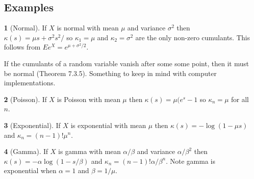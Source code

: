 \documentclass[11pt]{article}
\theoremstyle{definition}
\newtheorem*{example}{}
\begin{document}
\subsection{Examples}
\begin{example}[Normal]
If \(X\) is normal with mean \(\mu\) and variance \(\sigma^2\) then
\(\kappa(s) = \mu s + \sigma^2s^2/\) so
\(\kappa_1 = \mu\) and \(\kappa_2 = \sigma^2\) are the only non-zero
cumulants. This follows from \(Ee^X = e^{\mu + \sigma^2/2}\).

If the cumulants of
a random variable vanish after some some point, then it must
be normal\cite{Luk1970} (Theorem 7.3.5).
Something to keep in mind with computer
implementations.
\end{example}
\begin{example}[Poisson]
If \(X\) is Poisson
with mean \(\mu\) then \(\kappa(s) = \mu(e^s - 1\) so
\(\kappa_n = \mu\) for all \(n\).
\end{example}
\begin{example}[Exponential]
If \(X\) is exponential with mean \(\mu\) then
\(\kappa(s) = -\log(1 - \mu s)\) and
\(\kappa_n = (n - 1)!\mu^n\).
\end{example}
\begin{example}[Gamma]
If \(X\) is gamma with mean \(\alpha/\beta\) and variance
\(\alpha/\beta^2\) then
\(\kappa(s) = -\alpha\log(1 - s/\beta)\) and
\(\kappa_n = (n - 1)!\alpha/\beta^n\).
Note gamma is exponential when
\(\alpha = 1\) and \(\beta = 1/\mu\).


\end{example}
\end{document}
